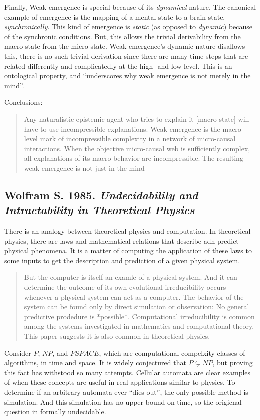 \documentclass{article}
\newcommand{\ti}[1]{\textit{#1}}
\newcommand{\annbibtitle}[2]{\subsection*{#1. \ti{#2}}}
\begin{document}
Finally, Weak emergence is special because of its \ti{dynamical} nature. The canonical example of emergence is the mapping of a mental state to a brain state, \ti{synchronically}. This kind of emergence is \ti{static} (as opposed to \ti{dynamic}) because of the synchronic conditions. But, this allows the trivial derivability from the macro-state from the micro-state. Weak emergence's dynamic nature disallows this, there is no such trivial derivation since there are many time steps that are related differently and complicatedly at the high- and low-level. This is an ontological property, and ``underscores why weak emergence is not merely in the mind''.

Conclusions:
\begin{quote}
    Any naturalistic epistemic agent who tries to explain it [macro-state] will have to use incompressible explanations. Weak emergence is the macro-level mark of incompressible complexity in a network of micro-causal interactions. When the objective micro-causal web is sufficiently complex, all explanations of its macro-behavior are incompressible. The resulting weak emergence is not just in the mind
\end{quote}

\annbibtitle{Wolfram S. 1985}{Undecidability and Intractability in Theoretical Physics}

There is an analogy between theoretical physics and computation. In theoretical physics, there are laws and mathematical relations that describe adn predict physical phenomena. It is a matter of computing the application of these laws to some inputs to get the description and prediction of a given physical system.

\begin{quote}
But the computer is itself an examle of a physical system. And it can determine the outcome of its own evolutional irreducibility occurs whenever a physical system can act as a computer. The behavior of the system can be found only by direct simulation or observation: No general predictive prodedure is *possible*. Computational irreducibility is common among the systems investigated in mathematics and computational theory. This paper suggests it is also common in theoretical physics.
\end{quote}

Consider $P$, $NP$, and $PSPACE$, which are computational compelxity classes of algorithms, in time and space. It is widely conjectured that $P \subsetneq NP$, but proving this fact has withstood so many attempts. Cellular automata are clear examples of when these concepts are useful in real applications similar to physics. To determine if an arbitrary automata ever ``dies out'', the only possible method is simulation. And this simulation has no upper bound on time, so the origicnal question in formally undecidable.
\end{document}
